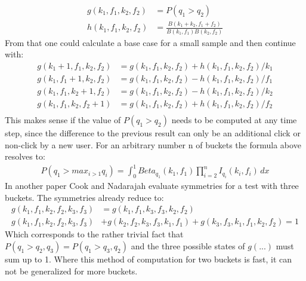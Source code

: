 \documentclass[../Thesis.tex]{subfiles}
\begin{document}
\begin{align*}
g(k_1,f_1,k_2,f_2) &= P(q_1>q_2) \\
h(k_1,f_1,k_2,f_2) &= \frac{B(k_1+k_2,f_1+f_2)}{B(k_1,f_1)B(k_2,f_2)}
\end{align*}
From that one could calculate a base case for a small sample and then continue with:
\begin{align*}
g(k_1 + 1,f_1,k_2,f_2) &= g(k_1,f_1,k_2,f_2) + h(k_1,f_1,k_2,f_2)/k_1 \\
g(k_1,f_1 + 1,k_2,f_2) &= g(k_1,f_1,k_2,f_2) - h(k_1,f_1,k_2,f_2)/f_1 \\
g(k_1,f_1,k_2 + 1,f_2) &= g(k_1,f_1,k_2,f_2) - h(k_1,f_1,k_2,f_2)/k_2 \\
g(k_1,f_1,k_2,f_2 + 1) &= g(k_1,f_1,k_2,f_2) + h(k_1,f_1,k_2,f_2)/f_2 \\
\end{align*}
This makes sense if the value of $P(q_1>q_2)$ needs to be computed at any time step, since the difference to the previous result can only be an additional click or non-click by a new user.
For an arbitrary number n of buckets the formula above resolves to:
\begin{align*}
P(q_1> max_{i>1}q_i)=\int_{0}^{1}Beta_{q_1}(k_1,f_1) \prod_{i=2}^{n} I_{q_i}(k_i,f_i)\,dx
\end{align*}
In another paper \cite{cook2006stochastic} Cook and Nadarajah evaluate symmetries for a test with three buckets. The symmetries already reduce to:
\begin{align*}
g(k_1,f_1,k_2,f_2,k_3,f_3) &= g(k_1,f_1,k_3,f_3,k_2,f_2) \\
g(k_1,f_1,k_2,f_2,k_3,f_3) &+ g(k_2,f_2,k_3,f_3,k_1,f_1) + g(k_3,f_3,k_1,f_1,k_2,f_2) = 1
\end{align*}
Which corresponds to the rather trivial fact that $P(q_1>q_2,q_3) = P(q_1>q_3,q_2)$ and the three possible states of $g(...)$ must sum up to 1. Where this method of computation for two buckets is fast, it can not be generalized for more buckets. 
\end{document}
